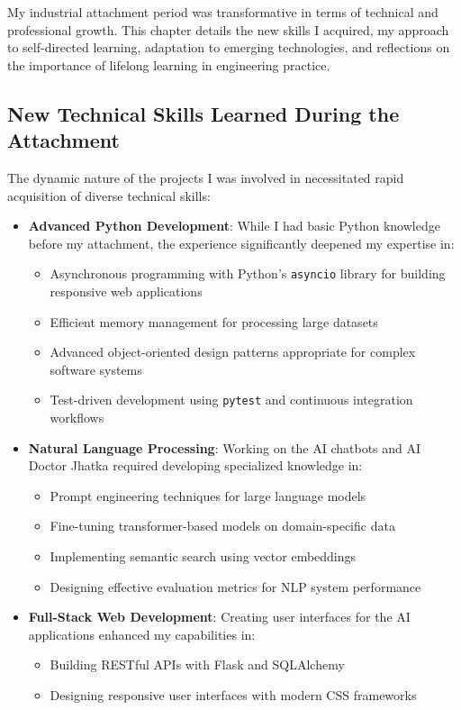 \documentclass[12pt,a4paper]{article}
\begin{document}
My industrial attachment period was transformative in terms of technical and professional growth. This chapter details the new skills I acquired, my approach to self-directed learning, adaptation to emerging technologies, and reflections on the importance of lifelong learning in engineering practice.

\subsection{New Technical Skills Learned During the Attachment}

The dynamic nature of the projects I was involved in necessitated rapid acquisition of diverse technical skills:

\begin{itemize}
    \item \textbf{Advanced Python Development}: While I had basic Python knowledge before my attachment, the experience significantly deepened my expertise in:
    \begin{itemize}
        \item Asynchronous programming with Python's \texttt{asyncio} library for building responsive web applications
        \item Efficient memory management for processing large datasets
        \item Advanced object-oriented design patterns appropriate for complex software systems
        \item Test-driven development using \texttt{pytest} and continuous integration workflows
    \end{itemize}
    
    \item \textbf{Natural Language Processing}: Working on the AI chatbots and AI Doctor Jhatka required developing specialized knowledge in:
    \begin{itemize}
        \item Prompt engineering techniques for large language models
        \item Fine-tuning transformer-based models on domain-specific data
        \item Implementing semantic search using vector embeddings
        \item Designing effective evaluation metrics for NLP system performance
    \end{itemize}
    
    \item \textbf{Full-Stack Web Development}: Creating user interfaces for the AI applications enhanced my capabilities in:
    \begin{itemize}
        \item Building RESTful APIs with Flask and SQLAlchemy
        \item Designing responsive user interfaces with modern CSS frameworks
    \end{itemize}
    

\end{itemize}
\end{document}
